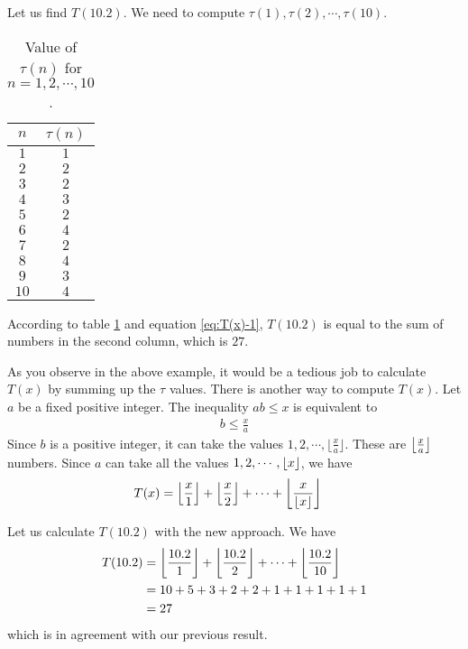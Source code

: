 \begin{example}
	Let us find $T(10.2)$. We need to compute $\tau(1), \tau(2), \cdots, \tau(10)$.
		\begin{table}
				\begin{center}
					\begin{tabular}{|c|c|}
						\hline
						$n$ & $\tau(n)$\\
						\hline
						$1$ & $1$\\
						\hline
						$2$ & $2$\\
						\hline
						$3$ & $2$\\
						\hline
						$4$ & $3$\\
						\hline
						$5$ & $2$\\
						\hline
						$6$ & $4$\\
						\hline
						$7$ & $2$\\
						\hline
						$8$ & $4$\\
						\hline
						$9$ & $3$\\
						\hline
						$10$ & $4$\\
						\hline
				\end{tabular}
				\caption{Value of $\tau(n)$ for $n=1,2,\cdots,10$.}\label{table:tau}
			\end{center}
		\end{table}
	According to table \ref{table:tau} and equation \ref{eq:T(x)-1}, $T(10.2)$ is equal to the sum of numbers in the second column, which is $27$.
\end{example}


As you observe in the above example, it would be a tedious job to calculate $T(x)$ by summing up the $\tau$ values. There is another way to compute $T(x)$. Let $a$ be a fixed positive integer. The inequality $ab \leq x$ is equivalent to
\begin{align*}
	b \leq \frac{x}{a}
\end{align*}
Since $b$ is a positive integer, it can take the values $1, 2, \cdots, \lfloor \frac{x}{a}\rfloor$. These are $\left\lfloor{\frac{x}{a}}\right\rfloor$ numbers. Since $a$ can take all the values $1, 2, \cdots, \left\lfloor{x}\right\rfloor$, we have
\begin{align*}
	T(x)
		& = \left\lfloor{\frac{x}{1}}\right\rfloor+ \left\lfloor{\frac{x}{2}}\right\rfloor+ \cdots +\left\lfloor{\frac{x}{\left\lfloor{x}\right\rfloor}}\right\rfloor
\end{align*}

\begin{example}
	Let us calculate $T(10.2)$ with the new approach. We have
		\begin{align*}
			T(10.2) &= \left\lfloor{\frac{10.2}{1}}\right\rfloor+\left\lfloor{\frac{10.2}{2}}\right\rfloor+ \cdots + \left\lfloor{\frac{10.2}{10}}\right\rfloor\\
					&= 10 + 5 + 3 + 2 + 2 + 1 + 1 + 1 + 1 + 1\\
					&= 27
		\end{align*}
	which is in agreement with our previous result.
\end{example}

